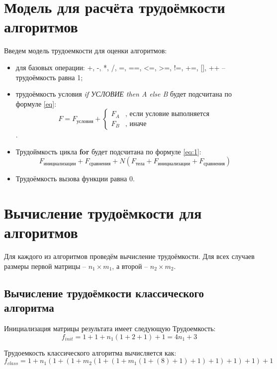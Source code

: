 \section{Модель для расчёта трудоёмкости алгоритмов}
Введем модель трудоемкости для оценки алгоритмов:
\begin{itemize}
	\item для базовых операции: +, -, *, /, =, ==, <=, >=, !=, +=, [], ++ -- трудоёмкость равна 1;
	\item трудоёмкость условия \textit{if УСЛОВИЕ then A else B} будет подсчитана по формуле \ref{eq}:
	\begin{equation}
		\label{eq}
		F = F_{условия} +
		\begin{cases}
			F_A &\text{, если условие выполняется}\\
			F_B &\text{, иначе}
		\end{cases}
	\end{equation}.
	\item Трудоймкость цикла \textbf{for} будет подсчитана по формуле \ref{eq:1}:
	\begin{equation}
		\label{eq:1}
		F_{инициализации} + F_{сравнения} + 
		N(F_{тела} + F_{инициализации} + F_{сравнения})
	\end{equation}
	\item Трудоёмкость вызова функции равна 0.
\end{itemize}

\section{Вычисление трудоёмкости для алгоритмов}
Для каждого из алгоритмов проведём вычисление трудоёмкости.
Для всех случаев размеры первой матрицы -- $n_1 \times m_1$, а второй -- $n_2 \times m_2$.

\subsection{Вычисление трудоёмкости классического алгоритма}
Инициализация матрицы результата имеет следующую Трудоемкость:
\begin{equation}
	f_{init} = 1 + 1 + n_1(1 + 2 + 1) + 1 = 4n_1 + 3
\end{equation}

Трудоемкость классического алгоритма вычисляется как:
\begin{equation}
f_{class} = 1 + n_1(1 + (1 + m_2(1 + (1 + m_1(1 + (8) + 1) + 1) + 1) + 1) + 1) + 1
\end{equation}

